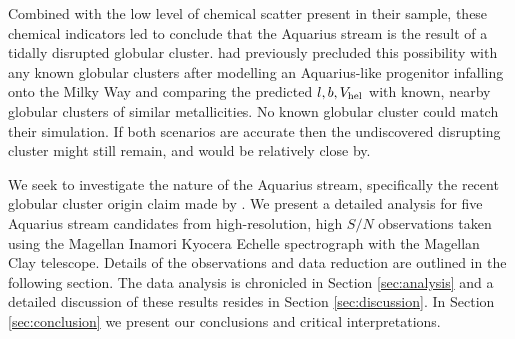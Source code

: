 \documentclass{emulateapj}
\begin{document}
Combined with the low level of chemical scatter present in their sample, these chemical indicators led \citet{wylie-de-boer;et-al_2012} to conclude that the Aquarius stream is the result of a tidally disrupted globular cluster. \citet{williams;et-al_2011} had previously precluded this possibility with any known globular clusters after modelling an Aquarius-like progenitor infalling onto the Milky Way and comparing the predicted $l, b, V_{\rm hel}$ with known, nearby globular clusters of similar metallicities. No known globular cluster could match their simulation. If both scenarios are accurate then the undiscovered disrupting cluster might still remain, and would be relatively close by.

We seek to investigate the nature of the Aquarius stream, specifically the recent globular cluster origin claim made by \citet{wylie-de-boer;et-al_2012}. We present a detailed analysis for five Aquarius stream candidates from high-resolution, high $S/N$ observations taken using the Magellan Inamori Kyocera Echelle spectrograph \citep{bernstein;et-al_2003} with the Magellan Clay telescope. Details of the observations and data reduction are outlined in the following section. The data analysis is chronicled in Section \ref{sec:analysis} and a detailed discussion of these results resides in Section \ref{sec:discussion}. In Section \ref{sec:conclusion} we present our conclusions and critical interpretations.
\end{document}
